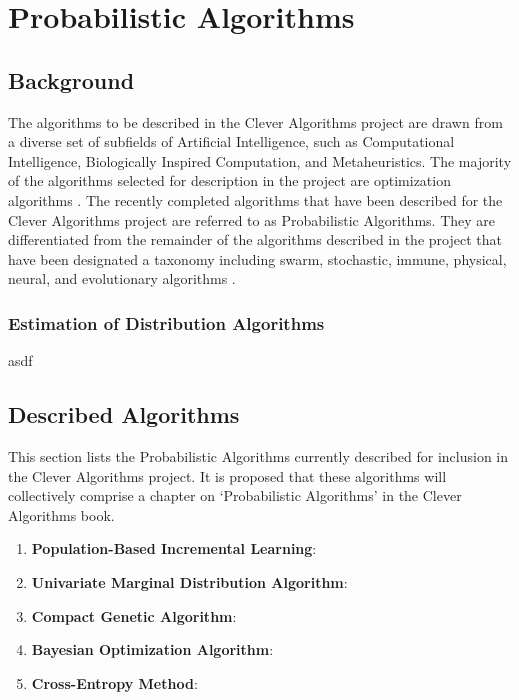 \documentclass[a4paper, 11pt]{article}
\begin{document}
% 
% 
\section{Probabilistic Algorithms}
\label{sec:algorithms}

% 
% 
\subsection{Background}
The algorithms to be described in the Clever Algorithms project are drawn from a diverse set of subfields of Artificial Intelligence, such as Computational Intelligence, Biologically Inspired Computation, and Metaheuristics. The majority of the algorithms selected for description in the project are optimization algorithms \cite{Brownlee2010b}. 
The recently completed algorithms that have been described for the Clever Algorithms project are referred to as Probabilistic Algorithms. They are differentiated from the remainder of the algorithms described in the project that have been designated a taxonomy including swarm, stochastic, immune, physical, neural, and evolutionary algorithms \cite{Brownlee2010b}. 

\subsubsection{Estimation of Distribution Algorithms}
asdf


% 
% 
\subsection{Described Algorithms}
\label{subsec:algorithms}
This section lists the Probabilistic Algorithms currently described for inclusion in the Clever Algorithms project. It is proposed that these algorithms will collectively comprise a chapter on `Probabilistic Algorithms' in the Clever Algorithms book. 

\begin{enumerate}
	\item \textbf{Population-Based Incremental Learning}: \cite{}
	\item \textbf{Univariate Marginal Distribution Algorithm}: \cite{}
	\item \textbf{Compact Genetic Algorithm}: \cite{}
	\item \textbf{Bayesian Optimization Algorithm}: \cite{}
	\item \textbf{Cross-Entropy Method}: \cite{}
\end{enumerate}
\end{document}
